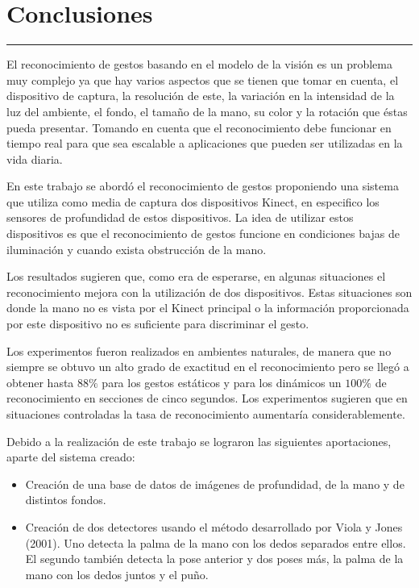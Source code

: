 \chapter{Conclusiones}\label{capit:cap6}
\vspace{-2.0325ex}%
\noindent
\rule{\textwidth}{0.5pt}
\vspace{-5.5ex}%
\newcommand{\pushline}{\Indp}%

El reconocimiento de gestos basando en el modelo de la visión es un problema muy complejo ya que hay varios aspectos que se tienen que tomar en cuenta, el dispositivo de captura, la resolución de este, la variación en la intensidad de la luz del ambiente, el fondo, el tamaño de la mano, su color y la rotación que \'estas pueda presentar. Tomando en cuenta que el reconocimiento debe funcionar en tiempo real para que sea escalable a aplicaciones que pueden ser utilizadas en la vida diaria. 

En este trabajo se abord\'o el reconocimiento de gestos proponiendo una sistema que utiliza como media de captura dos dispositivos Kinect, en especifico los sensores de profundidad de estos dispositivos. La idea de utilizar estos dispositivos es que el reconocimiento de gestos funcione en condiciones bajas de iluminación y cuando exista obstrucción de la mano.  

Los resultados sugieren que, como era de esperarse, en algunas situaciones el reconocimiento mejora con la utilización de dos dispositivos. Estas situaciones son donde la mano no es vista por el Kinect principal o la información proporcionada por este dispositivo no es suficiente para discriminar el gesto.
   
Los experimentos fueron realizados en ambientes naturales, de manera que no siempre se obtuvo un alto grado de exactitud en el reconocimiento pero se lleg\'o a obtener hasta $88 \%$ para los gestos estáticos y para los dinámicos un $100 \%$ de reconocimiento en secciones de cinco segundos. Los experimentos sugieren que en situaciones controladas la tasa de reconocimiento aumentaría considerablemente. 

Debido a la realización de este trabajo se lograron las siguientes aportaciones, aparte del sistema creado: 
 
\begin{itemize}

\item Creación de una base de datos de imágenes de profundidad, de la mano y de distintos fondos.   

\item Creación de dos detectores usando el método desarrollado por Viola y Jones (2001). Uno detecta la palma de la mano con los dedos separados entre ellos. El segundo también detecta la pose anterior y dos poses más, la palma de la mano con los dedos juntos y el puño. 

\end{itemize}


